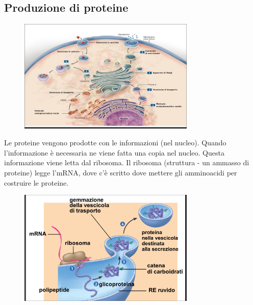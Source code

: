 \documentclass[a4paper]{article}
\begin{document}


\pagebreak

\subsection{Produzione di proteine}


\begin{figure}[th]
    \centering
    \includegraphics[width=0.75\textwidth]{./prod_cellula.png}
\end{figure}

Le proteine vengono prodotte con le informazioni (nel nucleo).
Quando l'informazione è necessaria ne viene fatta una copia nel nucleo.
Questa informazione viene letta dal ribosoma.
Il ribosoma (struttura - un ammasso di proteine) legge l'mRNA,
dove c'è scritto dove mettere gli amminoacidi per costruire le proteine.

\begin{figure}[th]
    \centering
    \includegraphics[width=0.75\textwidth]{./prod_cellula2.png}
\end{figure}
\end{document}
